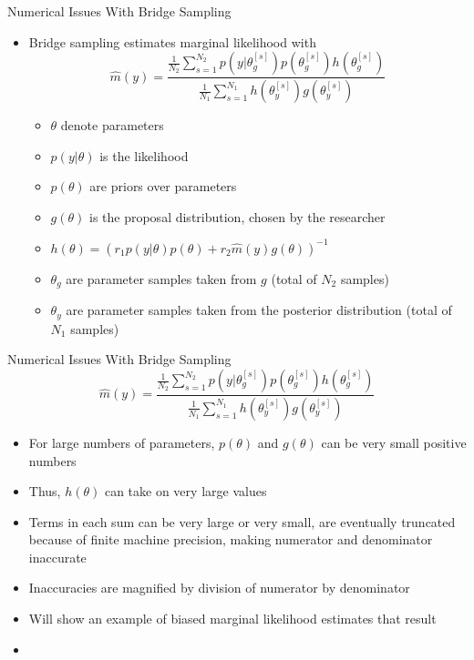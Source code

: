 \documentclass{beamer}
\begin{document}
\begin{frame}{Numerical Issues With Bridge Sampling}
\begin{itemize}
	\item Bridge sampling estimates marginal likelihood with $$\hat{m}(y) = \frac{\frac{1}{N_2}\sum_{s=1}^{N_2} p\left(y|\theta_{g}^{[s]}\right)p\left(\theta_{g}^{[s]}\right)h\left(\theta_{g}^{[s]}\right)}{\frac{1}{N_1}\sum_{s=1}^{N_1} h\left(\theta_{y}^{[s]}\right)g\left(\theta_{y}^{[s]}\right)}$$
		\begin{itemize}
			\item $\theta$ denote parameters
			\item $p(y|\theta)$ is the likelihood
			\item $p(\theta)$ are priors over parameters
			\item $g(\theta)$ is the proposal distribution, chosen by the researcher
			\item $h(\theta) = \left(r_1 p(y|\theta) p(\theta) + r_2 \hat{m}(y) g(\theta)\right)^{-1}$
			\item $\theta_g$ are parameter samples taken from $g$ (total of $N_2$ samples)
			\item $\theta_y$ are parameter samples taken from the posterior distribution (total of $N_1$ samples)
		\end{itemize}
\end{itemize}
\end{frame}

\begin{frame}{Numerical Issues With Bridge Sampling}
$$\hat{m}(y) = \frac{\frac{1}{N_2}\sum_{s=1}^{N_2} p\left(y|\theta_{g}^{[s]}\right)p\left(\theta_{g}^{[s]}\right)h\left(\theta_{g}^{[s]}\right)}{\frac{1}{N_1}\sum_{s=1}^{N_1} h\left(\theta_{y}^{[s]}\right)g\left(\theta_{y}^{[s]}\right)}$$
\begin{itemize}
	\item For large numbers of parameters, $p(\theta)$ and $g(\theta)$ can be very small positive numbers
	\item Thus, $h(\theta)$ can take on very large values
	\item Terms in each sum can be very large or very small, are eventually truncated because of finite machine precision, making numerator and denominator inaccurate
	\item Inaccuracies are magnified by division of numerator by denominator
	\item Will show an example of biased marginal likelihood estimates that result
\end{itemize}
\end{frame}

\begin{frame}{}
\begin{itemize}
	\item 
\end{itemize}
\end{frame}
\end{document}
